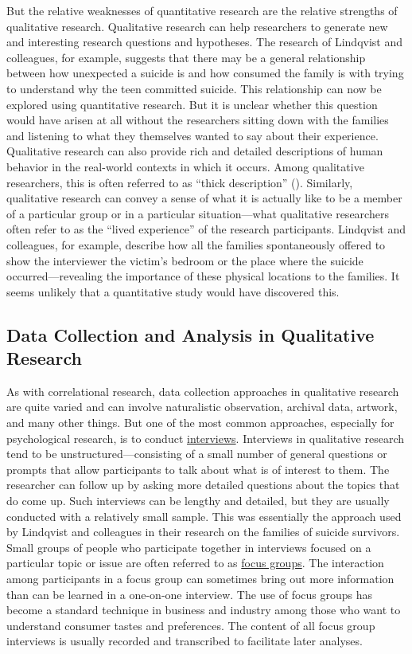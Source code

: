 \documentclass[
]{krantz}
\begin{document}
But the relative weaknesses of quantitative research are the relative strengths of qualitative research. Qualitative research can help researchers to generate new and interesting research questions and hypotheses. The research of Lindqvist and colleagues, for example, suggests that there may be a general relationship between how unexpected a suicide is and how consumed the family is with trying to understand why the teen committed suicide. This relationship can now be explored using quantitative research. But it is unclear whether this question would have arisen at all without the researchers sitting down with the families and listening to what they themselves wanted to say about their experience. Qualitative research can also provide rich and detailed descriptions of human behavior in the real-world contexts in which it occurs. Among qualitative researchers, this is often referred to as ``thick description'' (). Similarly, qualitative research can convey a sense of what it is actually like to be a member of a particular group or in a particular situation---what qualitative researchers often refer to as the ``lived experience'' of the research participants. Lindqvist and colleagues, for example, describe how all the families spontaneously offered to show the interviewer the victim's bedroom or the place where the suicide occurred---revealing the importance of these physical locations to the families. It seems unlikely that a quantitative study would have discovered this.

\subsection*{Data Collection and Analysis in Qualitative Research}\label{data-collection-and-analysis-in-qualitative-research}


As with correlational research, data collection approaches in qualitative research are quite varied and can involve naturalistic observation, archival data, artwork, and many other things. But one of the most common approaches, especially for psychological research, is to conduct \hyperref[interviews]{interviews}. Interviews in qualitative research tend to be unstructured---consisting of a small number of general questions or prompts that allow participants to talk about what is of interest to them. The researcher can follow up by asking more detailed questions about the topics that do come up. Such interviews can be lengthy and detailed, but they are usually conducted with a relatively small sample. This was essentially the approach used by Lindqvist and colleagues in their research on the families of suicide survivors. Small groups of people who participate together in interviews focused on a particular topic or issue are often referred to as \hyperref[focus-groups]{focus groups}. The interaction among participants in a focus group can sometimes bring out more information than can be learned in a one-on-one interview. The use of focus groups has become a standard technique in business and industry among those who want to understand consumer tastes and preferences. The content of all focus group interviews is usually recorded and transcribed to facilitate later analyses.
\end{document}
